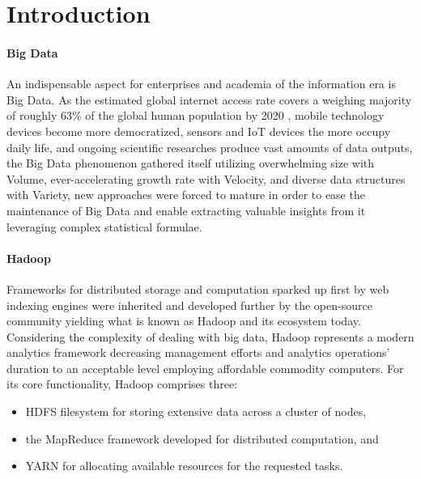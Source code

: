 \documentclass[review]{elsarticle}
\begin{document}
\linenumbers

\section{Introduction}

\paragraph{Big Data}
An indispensable aspect for enterprises and academia of the information era is Big Data. As the estimated global internet access rate covers a weighing majority of roughly 63\% of the global human population by 2020 \cite{noauthor_world_nodate}, mobile technology devices become more democratized, sensors and IoT devices the more occupy daily life, and ongoing scientific researches produce vast amounts of data outputs, the Big Data phenomenon gathered itself utilizing overwhelming size with Volume, ever-accelerating growth rate with Velocity, and diverse data structures with Variety, new approaches were forced to mature in order to ease the maintenance of Big Data and enable extracting valuable insights from it leveraging complex statistical formulae.

\paragraph{Hadoop \cite{noauthor_apache_nodate}}Frameworks for distributed storage and computation sparked up first by web indexing engines were inherited and developed further by the open-source community yielding what is known as Hadoop and its ecosystem today. Considering the complexity of dealing with big data, Hadoop represents a modern analytics framework decreasing management efforts and analytics operations' duration to an acceptable level employing affordable commodity computers. For its core functionality, Hadoop comprises three:

\begin{itemize}
	\item HDFS filesystem for storing extensive data across a cluster of nodes,
	\item the MapReduce framework developed for distributed computation, and 
	\item YARN for allocating available resources for the requested tasks.
\end{itemize}
\end{document}
